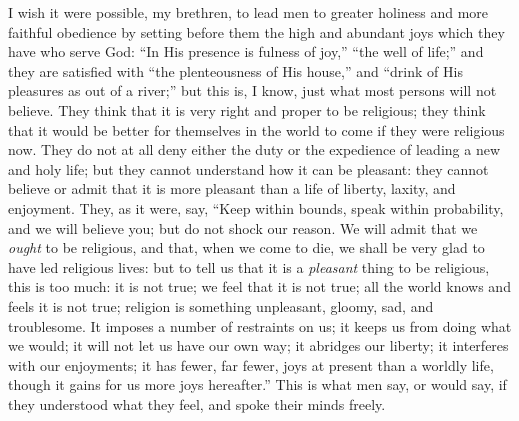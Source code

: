 I wish it were possible, my brethren, to lead men to
greater holiness and more faithful obedience by setting
before them the high and abundant joys which they have
who serve God: ``In His presence is fulness of
joy,'' ``the well of life;'' and they are
satisfied with ``the plenteousness of His
house,'' and ``drink of His pleasures as out of a
river;'' but this is, I know, just what most persons
will not believe. They think that it is very right and
proper to be religious; they think that it would be
better for themselves in the world to come if they were
religious now. They do not at all deny either the duty or
the expedience of leading a new and holy life; but they
cannot understand how it can be pleasant: they cannot
believe or admit that it is more pleasant than a life of
liberty, laxity, and enjoyment. They, as it were, say,
``Keep within bounds, speak within probability, and
we will believe you; but do not shock our reason. We will
admit that we \emph{ought} to be religious, and that,
when we come to die, we shall be very glad to have led
religious lives: but to tell us that it is a \emph{pleasant}
thing to be religious, this is too much: it is not true;
we feel that it is not true; all the world knows and
feels it is not true; religion is something unpleasant,
gloomy, sad, and troublesome. It imposes a number of
restraints on us; it keeps us from doing what we would;
it will not let us have our own way; it abridges our
liberty; it interferes with our enjoyments; it has fewer,
far fewer, joys at present than a worldly life, though it
gains for us more joys hereafter.'' This is what men
say, or would say, if they understood what they feel, and
spoke their minds freely.

